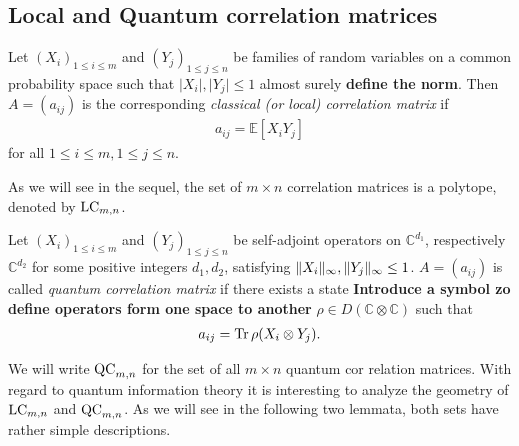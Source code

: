 \subsection{Local and Quantum correlation matrices}
\begin{dfn}
	Let $ (X_i)_{1 \le i \le m } $ and $ (Y_j)_{1 \le j \le n} $ be families of random variables on a common probability space such that $ \vert X_i \vert, \vert Y_j \vert \le 1 $ almost surely \textbf{define the norm}. Then $ A=(a_{ij}) $ is the corresponding {\itshape classical (or local) correlation matrix} if 
	\begin{align*}
		a_{ij} = \mathbb{E}[X_iY_j]
	\end{align*}
	for all $ 1 \le i \le m, 1 \le j \le n $.
\end{dfn}
As we will see in the sequel, the set of $ m \times n $ correlation matrices is a polytope, denoted by $ \textup{LC}_{m,n} $.

\begin{dfn}
	Let $ (X_i)_{1 \le i \le m } $ and $ (Y_j)_{1 \le j \le n} $ be self-adjoint operators on $ \mathbb{C}^{d_1} $, respectively $ \mathbb{C}^{d_2} $ for some positive integers $ d_1,d_2 $, satisfying $  \Vert {X_i} \Vert_{\infty},  \Vert {Y_j} \Vert_{\infty} \le 1 $. $ A = (a_{ij}) $ is called {\itshape quantum correlation matrix} if there exists a state \textbf{Introduce a symbol zo define operators form one space to another} $ \rho \in D(\mathbb{C} \otimes \mathbb{C})$ such that 
	\begin{align*}
		a_{ij} = \text{Tr} \, {\rho (X_i \otimes Y_j)} .
	\end{align*}
\end{dfn}
We will write $ \textup{QC}_{m,n} $ for the set of all $ m \times n $ quantum cor relation matrices.
With regard to quantum information theory it is interesting to analyze the geometry of $ \textup{LC}_{m,n} $ and $ \textup{QC}_{m,n} $. As we will see in the following two lemmata, both sets have rather simple descriptions. 

